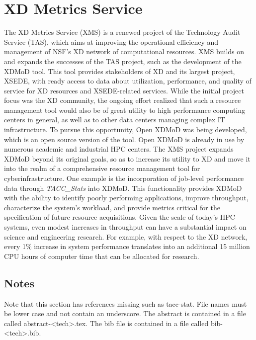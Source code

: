 \section{XD Metrics Service}

The XD Metrics Service (XMS) \cite{xms-vonLaszewski15tas} is a renewed
project of the Technology Audit Service (TAS), which aims at improving
the operational efficiency and management of NSF's XD network of
computational resources. XMS builds on and expands the successes of
the TAS project, such as the development of the XDMoD tool. This tool
provides stakeholders of XD and its largest project, XSEDE, with ready
access to data about utilization, performance, and quality of service
for XD resources and XSEDE-related services. While the initial project
focus was the XD community, the ongoing effort realized that such a
resource management tool would also be of great utility to high
performance computing centers in general, as well as to other data
centers managing complex IT infrastructure. To pursue this
opportunity, Open XDMoD was being developed, which is an open source
version of the tool. Open XDMoD is already in use by numerous academic
and industrial HPC centers. The XMS project expands XDMoD beyond its
original goals, so as to increase its utility to XD and move it into
the realm of a comprehensive resource management tool for
cyberinfrastructure. One example is the incorporation of job-level
performance data through {\em TACC\_Stats} into XDMoD. This
functionality provides XDMoD with the ability to identify poorly
performing applications, improve throughput, characterize the system's
workload, and provide metrics critical for the specification of future
resource acquisitions. Given the scale of today's HPC systems, even
modest increases in throughput can have a substantial impact on
science and engineering research. For example, with respect to the XD
network, every 1\% increase in system performance translates into an
additional 15 million CPU hours of computer time that can be allocated
for research.

\subsection{Notes}

Note that this section has references missing such as tacc-stat. File
names must be lower case and not contain an underscore. The abstract
is contained in a file called abstract-<tech>.tex. The bib file is
contained in a file called bib-<tech>.bib.

